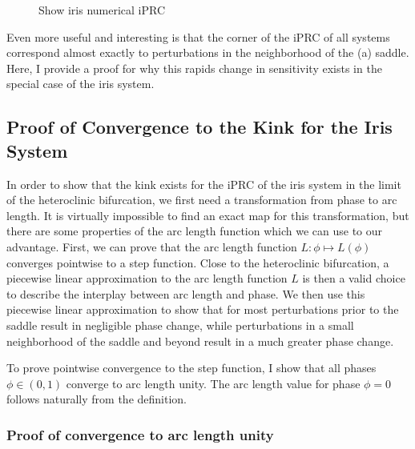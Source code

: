 \begin{figure}
 
 \caption{Show iris numerical iPRC}%
\label{fig:iprcs-corner}\end{figure}

Even more useful and interesting is that the corner of the iPRC of all systems correspond almost exactly to perturbations in the neighborhood of the (a) saddle.  Here, I provide a proof for why this rapids change in sensitivity exists in the special case of the iris system.%


\subsection{Proof of Convergence to the Kink for the Iris System}
In order to show that the kink exists for the iPRC of the iris system in the limit of the heteroclinic bifurcation, we first need  a transformation from phase to arc length.  It is virtually impossible to find an exact map for this transformation, but there are some properties of the arc length function which we can use to our advantage.  First, we can prove that the arc length function $L: \phi \mapsto L(\phi)$ converges pointwise to a step function.  Close to the heteroclinic bifurcation, a piecewise linear approximation to the arc length function $L$ is then a valid choice to describe the interplay between arc length and phase.  We then use this piecewise linear approximation to show that for most perturbations prior to the saddle result in negligible phase change, while perturbations in a small neighborhood of the saddle and beyond result in a much greater phase change.

To prove pointwise convergence to the step function, I show that all phases $\phi \in (0,1)$ converge to arc length unity.  The arc length value for phase $\phi = 0$ follows naturally from the definition.

\subsubsection{Proof of convergence to arc length unity}

